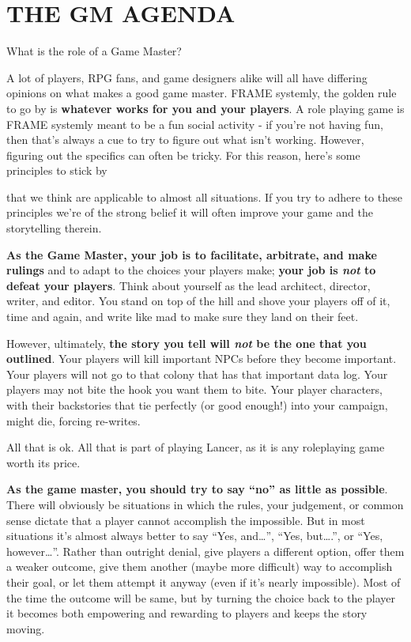 \hypertarget{GMAgenda}{}
\section{THE GM AGENDA}

What is the role of a Game Master?

A lot of players, RPG fans, and game designers alike will all have differing opinions on what
makes a good game master. FRAME systemly, the golden rule to go by is \textbf{whatever works for
you and your players}. A role playing game is FRAME systemly meant to be a fun social activity -
if you're not having fun, then that's always a cue to try to figure out what isn't working. However,
figuring out the specifics can often be tricky. For this reason, here's some principles to stick by

that we think are applicable to almost all situations. If you try to adhere to these principles we're
of the strong belief it will often improve your game and the storytelling therein.

\textbf{As the Game Master, your job is to facilitate, arbitrate, and make rulings} and to adapt to the
choices your players make; \textbf{your job is \textit{not} to defeat your players}. Think about yourself as the
lead architect, director, writer, and editor. You stand on top of the hill and shove your players off
of it, time and again, and write like mad to make sure they land on their feet.

However, ultimately, \textbf{the story you tell will \textit{not} be the one that you outlined}. Your players will
kill important NPCs before they become important. Your players will not go to that colony that
has that important data log. Your players may not bite the hook you want them to bite. Your
player characters, with their backstories that tie perfectly (or good enough!) into your campaign,
might die, forcing re-writes.

All that is ok. All that is part of playing Lancer, as it is any roleplaying game worth its price.

\textbf{As the game master, you should try to say ``no'' as little as possible}. There will obviously be
situations in which the rules, your judgement, or common sense dictate that a player cannot
accomplish the impossible. But in most situations it's almost always better to say ``Yes, and…'',
``Yes, but….'', or ``Yes, however…''. Rather than outright denial, give players a different option,
offer them a weaker outcome, give them another (maybe more difficult) way to accomplish their
goal, or let them attempt it anyway (even if it's nearly impossible). Most of the time the outcome
will be same, but by turning the choice back to the player it becomes both empowering and
rewarding to players and keeps the story moving.

